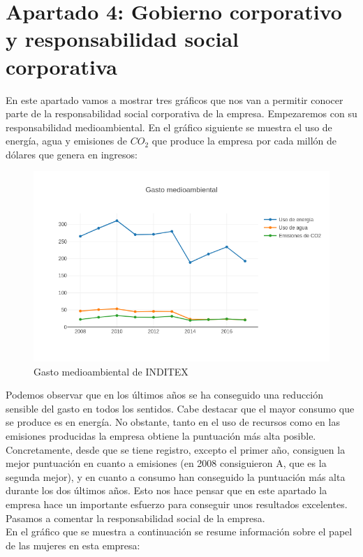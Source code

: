 \documentclass[11pt]{article}
\theoremstyle{plain}
\theoremstyle{definition}
\begin{document}
\section*{Apartado 4: Gobierno corporativo y responsabilidad social
  corporativa}

En este apartado vamos a mostrar tres gráficos que nos van a permitir
conocer parte de la responsabilidad social corporativa de la
empresa. Empezaremos con su responsabilidad medioambiental. En el
gráfico siguiente se muestra el uso de energía, agua y emisiones de
$CO_2$ que produce la empresa por cada millón de dólares que genera en
ingresos:

\begin{figure}[H]
  \centering
  \includegraphics[width=\textwidth]{graphs/environment.png}
  \caption{Gasto medioambiental de INDITEX}
\end{figure}

Podemos observar que en los últimos años se ha conseguido una
reducción sensible del gasto en todos los sentidos. Cabe destacar que
el mayor consumo que se produce es en energía. No obstante, tanto en el
uso de recursos como en las emisiones producidas la empresa obtiene la
puntuación más alta posible. Concretamente, desde que se tiene
registro, excepto el primer año, consiguen la mejor puntuación en
cuanto a emisiones (en 2008 consiguieron A, que es la segunda mejor),
y en cuanto a consumo han conseguido la puntuación más alta durante
los dos últimos años. Esto nos hace pensar que en este apartado la
empresa hace un importante esfuerzo para conseguir unos resultados
excelentes. Pasamos a comentar la responsabilidad social de la empresa.\\

En el gráfico que se muestra a continuación se resume información
sobre el papel de las mujeres en esta empresa:
\end{document}
